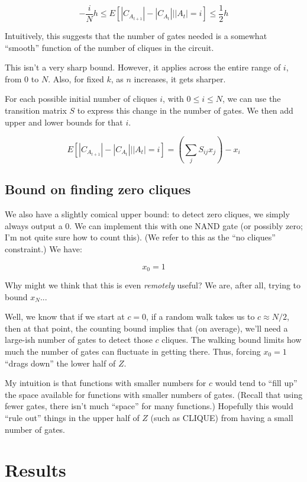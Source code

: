 \documentclass[12pt]{article}
\theoremstyle{definition}
\begin{document}
\[
-\frac{i}{N}h \le E[ |C_{A_{t+1}}| - |C_{A_t}| | |A_t|=i ] \le \frac{1}{2}h
\]

Intuitively, this suggests that the number
of gates needed is a somewhat ``smooth'' function of the
number of cliques in the circuit.

This isn't a very sharp bound. However, it applies across the entire
range of $i$, from 0 to $N$. Also, for fixed $k$, as $n$ increases,
it gets sharper.

For each possible initial number of cliques $i$, with $0 \le i \le N$,
we can use the transition matrix $S$ to express this change in the
number of gates. We then add upper and lower bounds for that $i$.

\[
E[ |C_{A_{t+1}}| - |C_{A_t}| | |A_t|=i ] = (\sum_j S_{ij} x_j) - x_i
\]

\subsection{Bound on finding zero cliques}

We also have a slightly comical upper bound:
to detect zero cliques, we simply always
output a 0. We can implement this with one NAND gate (or possibly zero;
I'm not quite sure how to count this). (We refer to this as the
``no cliques'' constraint.) We have:

\[
x_0 = 1
\]

Why might we think that this is even {\em remotely} useful? We are, after
all, trying to bound $x_N$...

Well, we know that if we start at $c=0$, if a random walk takes us to
$c \approx N/2$, then at that point, the counting bound implies that
(on average), we'll need a large-ish number of gates to detect those $c$ cliques.
The walking bound limits how much the number of gates can fluctuate
in getting there. Thus, forcing $x_0=1$ ``drags down'' the lower half of $Z$.

My intuition is that functions with smaller numbers for $c$ would
tend to ``fill up'' the space available for functions with smaller numbers of gates.
(Recall that using fewer gates, there isn't much ``space'' for many functions.)
Hopefully this would ``rule out'' things in the upper half of $Z$ (such as CLIQUE)
from having a small number of gates.

\section{Results}
\end{document}
